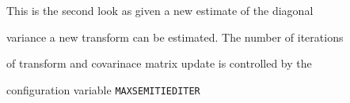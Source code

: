 This is the second look as given a new estimate of the diagonal


variance a new transform can be estimated. The number of iterations


of transform and covarinace matrix update is controlled by the 


 configuration variable {\tt MAXSEMITIEDITER}

























